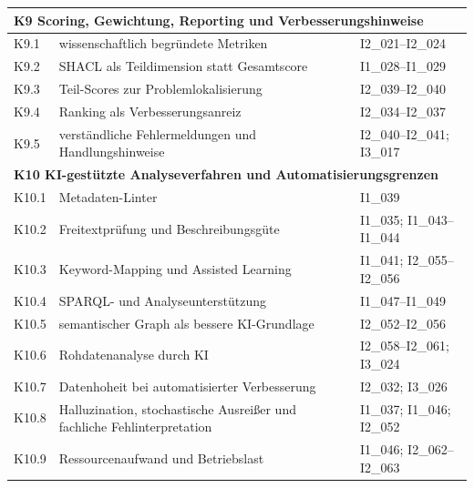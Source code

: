 \begin{table}[H]
\begin{tabular}{p{1cm} p{8.8cm} p{2.5cm}}
\multicolumn{3}{l}{\textbf{K9 Scoring, Gewichtung, Reporting und Verbesserungshinweise}} \\
\midrule
K9.1 & wissenschaftlich begründete Metriken & I2\_021--I2\_024 \\ \hline
K9.2 & SHACL als Teildimension statt Gesamtscore & I1\_028--I1\_029 \\ \hline
K9.3 & Teil-Scores zur Problemlokalisierung & I2\_039--I2\_040 \\ \hline
K9.4 & Ranking als Verbesserungsanreiz & I2\_034--I2\_037 \\ \hline
K9.5 & verständliche Fehlermeldungen und Handlungshinweise & I2\_040--I2\_041; I3\_017 \\
\midrule

\multicolumn{3}{l}{\textbf{K10 KI-gestützte Analyseverfahren und Automatisierungsgrenzen}} \\
\midrule
K10.1 & Metadaten-Linter & I1\_039 \\ \hline
K10.2 & Freitextprüfung und Beschreibungsgüte & I1\_035; I1\_043--I1\_044 \\ \hline
K10.3 & Keyword-Mapping und Assisted Learning & I1\_041; I2\_055--I2\_056 \\ \hline
K10.4 & SPARQL- und Analyseunterstützung & I1\_047--I1\_049 \\ \hline
K10.5 & semantischer Graph als bessere KI-Grundlage & I2\_052--I2\_056 \\ \hline
K10.6 & Rohdatenanalyse durch KI & I2\_058--I2\_061; I3\_024 \\ \hline
K10.7 & Datenhoheit bei automatisierter Verbesserung & I2\_032; I3\_026 \\ \hline
K10.8 & Halluzination, stochastische Ausreißer und fachliche Fehlinterpretation & I1\_037; I1\_046; I2\_052 \\ \hline
K10.9 & Ressourcenaufwand und Betriebslast & I1\_046; I2\_062--I2\_063 \\

\bottomrule
\end{tabular}
\end{table}